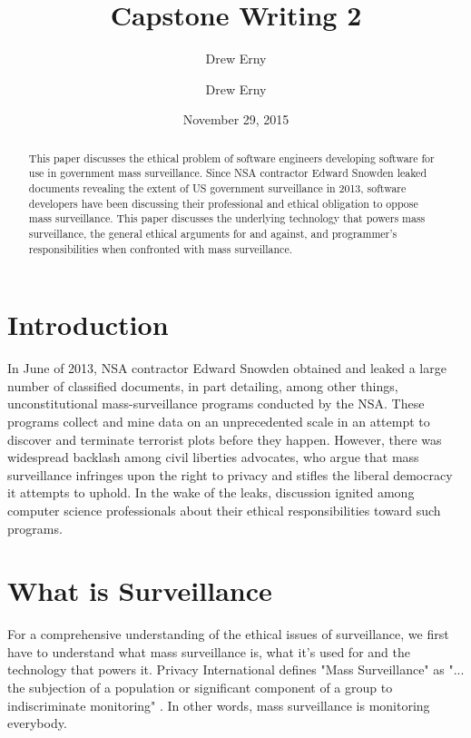 \documentclass{sig-alternate-05-2015}
\begin{document}
\title{Capstone Writing 2}
\author{Drew Erny}
\date{November 29, 2015}


\author{
  \alignauthor
  Drew Erny
}

\maketitle
\begin{abstract}
This paper discusses the ethical problem of software engineers developing
software for use in government mass surveillance. Since NSA contractor Edward
Snowden leaked documents revealing the extent of US government surveillance in
2013, software developers have been discussing their professional and ethical
obligation to oppose mass surveillance. This paper discusses the underlying
technology that powers mass surveillance, the general ethical arguments for and
against, and programmer's responsibilities when confronted with mass
surveillance.
\end{abstract}

\section{Introduction}
In June of 2013, NSA contractor Edward Snowden obtained and leaked a large
number of classified documents, in part detailing, among other things,
unconstitutional mass-surveillance programs conducted by the NSA. These
programs collect and mine data on an unprecedented scale in an attempt to
discover and terminate terrorist plots before they happen. However, there was
widespread backlash among civil liberties advocates, who argue that mass
surveillance infringes upon the right to privacy and stifles the liberal
democracy it attempts to uphold. In the wake of the leaks, discussion ignited
among computer science professionals about their ethical responsibilities
toward such programs. 

\section{What is Surveillance}

For a comprehensive understanding of the ethical issues of surveillance, we
first have to understand what mass surveillance is, what it's used for and the
technology that powers it. Privacy International defines "Mass Surveillance" as
"... the subjection of a population or significant component of a group to
indiscriminate monitoring" \cite{website:privint}. In other words, mass
surveillance is monitoring everybody. 
\end{document}
